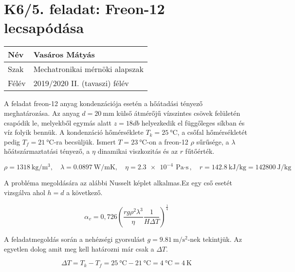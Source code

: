 \section*{K6/5. feladat: Freon-12 lecsapódása}

\begin{tabular}{ | p{2cm} | p{14cm} | } 
	\hline
	Név & Vasáros Mátyás \\ 
	\hline
	Szak & Mechatronikai mérnöki alapszak\\ 
	\hline
	Félév & 2019/2020 II. (tavaszi) félév \\ 
	\hline
\end{tabular}
\vspace{0.5cm}

\noindent A feladat freon-12 anyag kondenzációja esetén a hőátadási tényező meghatározása. Az anyag $ d=\SI {20}{\milli\meter}$ külső átmérőjű vízszintes csövek felületén csapódik le, melyekből egymás alatt $z= 18db$ helyezkedik el függőleges síkban és víz folyik bennük. A kondenzáció hőmérséklete $T_{k}=\SI{25}{\degreeCelsius}$, a csőfal hőmérsékletét pedig $T_f=\SI{21}{\degreeCelsius}$-ra becsüljük. Ismert $T=\SI{23}{\degreeCelsius}$-on a freon-12 $\rho$ sűrűsége, a $\lambda$ hőátszármaztatási tényező, a $\eta$ dinamikai viszkozitás és az $r$ fűtőérték.

\begin{equation*}
	\rho=\SI{1318}{\kilogram\per\meter\cubed},
	\quad 
	\lambda=\SI{0,0897}{\watt\per\meter\kelvin},
	\quad 
	\eta=\SI{2,3e-4}{\pascal\cdot\second },
	\quad 
	r=\SI{142,8}{\kilo\joule\per\kilogram}=\SI{142800}{\joule\per\kilogram}
\end{equation*}

\noindent\hrulefill

\noindent A probléma megoldására az alábbi Nusselt képlet alkalmas.Ez egy cső esetét vizsgálva ahol $h=d$ a következő.

\begin{equation}
\alpha_{v}=0,726\left(\dfrac{r g \rho^2 \lambda^3 }{\eta}\dfrac{1}{H \Delta T} \right)^\tfrac{1}{4}
\end{equation} 

\noindent A feladatmegoldás során a nehézségi gyorsulást $g=\SI{9,81}{\meter\per\second\squared}$-nek tekintjük. Az egyetlen dolog amit meg kell határozni már csak a $\Delta T$.

\begin{equation}
\Delta T = T_k-T_f=\SI{25}{\degreeCelsius}-\SI{21}{\degreeCelsius}=\SI{4}{\degreeCelsius}=\SI{4}{\kelvin}
\end{equation} 

